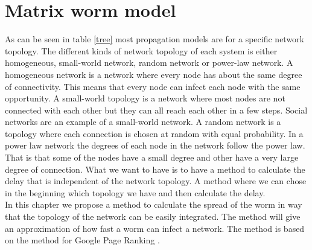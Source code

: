 \section{Matrix worm model}
\label{eigenmatrixmethode}
As can be seen in table \ref{tree} most propagation models are for a specific network topology. The different kinds of network topology of each system is either homogeneous, small-world network, random network or power-law network. A homogeneous network is a network where every node has about the same degree of connectivity. This means that every node can infect each node with the same opportunity. A small-world topology is a network where most nodes are not connected with each other but they can all reach each other in a few steps. Social networks are an example of a small-world network. A random network is a topology where each connection is chosen at random with equal probability. In a power law network the degrees of each node in the network follow the power law. That is that some of the nodes have a small degree and other have a very large degree of connection. What we want to have is to have a method to calculate the delay that is independent of the network topology. A method where we can chose in the beginning which topology we have and then calculate the delay.\\

In this chapter we propose a method to calculate the spread of the worm in way that the topology of the network can be easily integrated. The method will give an approximation of how fast a worm can infect a network. The method is based on the method for Google Page Ranking \cite{GoogleRank}. 

